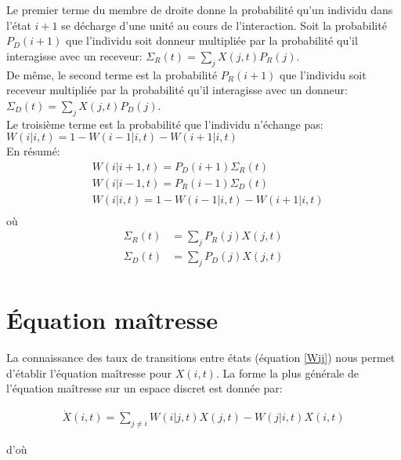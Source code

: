 Le premier terme du membre de droite donne la probabilité qu'un individu dans l'état $i+1$ se décharge d'une unité au cours de l'interaction. Soit la probabilité $P_D(i+1)$ que l'individu soit donneur multipliée par la probabilité qu'il interagisse avec un receveur: $\Sigma_R(t) = \sum_j X(j,t) P_R(j)$.\\
De même, le second terme est la probabilité $P_R(i+1)$ que l'individu soit receveur multipliée par la probabilité qu'il interagisse avec un donneur: $\Sigma_D(t) = \sum_j X(j,t) P_D(j)$.\\
Le troisième terme est la probabilité que l'individu n'échange pas: $W(i|i,t) = 1 - W(i-1|i,t)- W(i+1|i,t)$\\


En résumé:
\begin{equation}
\begin{aligned}
&W(i|i+1,t)= P_D(i+1) \Sigma_R(t)\\
&W(i|i-1,t)= P_R(i-1) \Sigma_D(t)\\
&W(i|i,t) = 1- W(i-1|i,t)- W(i+1|i,t)\\
\label{TransitionVoisins}
\end{aligned}
\end{equation}
où
\begin{equation}
\begin{aligned}
\Sigma_R	(t)	&= \sum_j P_R(j) X(j,t)\\
\Sigma_D(t) 	&= \sum_j P_D(j) X(j,t)\\
\label{SigmaRD}
\end{aligned}
\end{equation}



\section{Équation maîtresse}

La connaissance des taux de transitions entre états (équation \ref{Wij}) nous permet d'établir l'équation maîtresse pour $X(i,t)$. La forme la plus générale de l'équation maîtresse sur un espace discret \citep{vankampen} est donnée par:

\begin{equation}
\begin{aligned}
\dot{X}(i,t)= \sum_{j\neq i} W(i|j,t)X(j,t)-W(j|i,t)X(i,t)
\label{MasterGeneral}
\end{aligned}
\end{equation}

d'où

